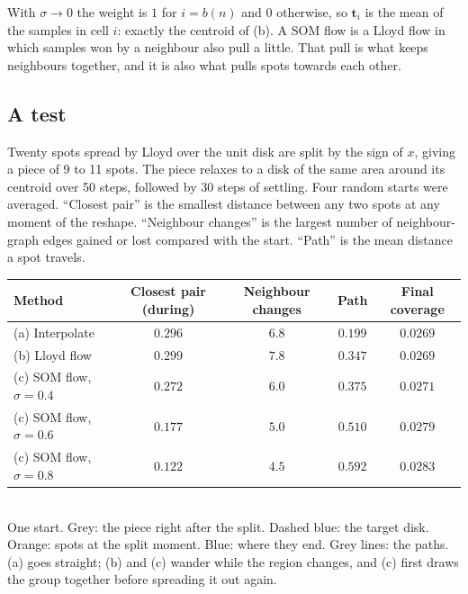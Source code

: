 \documentclass[11pt,a4paper]{article}
\newcommand{\vect}[1]{\mathbf{#1}}
\begin{document}
\begin{whybox}
With $\sigma\to0$ the weight is $1$ for $i=b(n)$ and $0$ otherwise, so $\vect{t}_i$ is the mean of the samples in
cell $i$: exactly the centroid of (b). A SOM flow is a Lloyd flow in which samples won by a neighbour also pull a
little. That pull is what keeps neighbours together, and it is also what pulls spots towards each other.
\end{whybox}

\subsection{A test}
Twenty spots spread by Lloyd over the unit disk are split by the sign of $x$, giving a piece of 9 to 11 spots. The
piece relaxes to a disk of the same area around its centroid over 50 steps, followed by 30 steps of settling.
Four random starts were averaged. ``Closest pair'' is the smallest distance between any two spots at any moment of
the reshape. ``Neighbour changes'' is the largest number of neighbour-graph edges gained or lost compared with the
start. ``Path'' is the mean distance a spot travels.

\begin{center}\small
\begin{tabular}{@{}lcccc@{}}
\toprule
Method & Closest pair (during) & Neighbour changes & Path & Final coverage\\
\midrule
(a) Interpolate & $0.296$ & $6.8$ & $\mathbf{0.199}$ & $0.0269$\\
(b) Lloyd flow & $\mathbf{0.299}$ & $7.8$ & $0.347$ & $0.0269$\\
(c) SOM flow, $\sigma=0.4$ & $0.272$ & $6.0$ & $0.375$ & $0.0271$\\
(c) SOM flow, $\sigma=0.6$ & $0.177$ & $5.0$ & $0.510$ & $0.0279$\\
(c) SOM flow, $\sigma=0.8$ & $0.122$ & $\mathbf{4.5}$ & $0.592$ & $0.0283$\\
\bottomrule
\end{tabular}
\end{center}

\begin{center}
\\
\small One start. Grey: the piece right after the split. Dashed blue: the target disk. Orange: spots at the split
moment. Blue: where they end. Grey lines: the paths. (a) goes straight; (b) and (c) wander while the region changes,
and (c) first draws the group together before spreading it out again.
\end{center}
\end{document}
